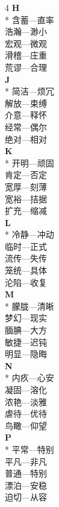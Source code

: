 \documentclass[final,oneside]{ctexbook}
\begin{document}
\begin{multicols}{4}
  \textbf{H}\\*
  含蓄---直率\\
  浩瀚---渺小\\
  宏观---微观\\
  滑稽---庄重\\
  荒谬---合理\\

  \textbf{J}\\*
  简洁---烦冗\\
  解放---束缚\\
  介意---释怀\\
  经常---偶尔\\
  绝对---相对\\

  \textbf{K}\\*
  开明---顽固\\
  肯定---否定\\
  宽厚---刻薄\\
  宽裕---拮据\\
  扩充---缩减\\

  \textbf{L}\\*
  冷静---冲动\\
  临时---正式\\
  流传---失传\\
  笼统---具体\\
  沦陷---收复\\

  \textbf{M}\\*
  朦胧---清晰\\
  梦幻---现实\\
  腼腆---大方\\
  敏捷---迟钝\\
  明显---隐晦\\

  \textbf{N}\\*
  内疚---心安\\
  凝固---溶化\\
  浓艳---淡雅\\
  虐待---优待\\
  鸟瞰---仰望\\

  \textbf{P}\\*
  平常---特别\\
  平凡---非凡\\
  普通---特别\\
  漂泊---安稳\\
  迫切---从容\\


\end{multicols}
\end{document}
